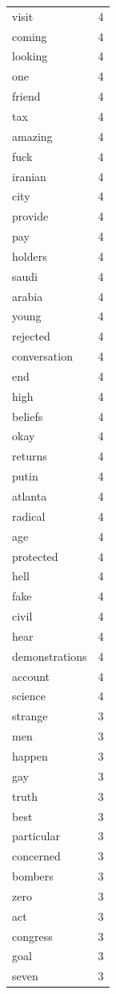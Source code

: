 \begin{tabular}{lr}
visit & 4 \\
coming & 4 \\
looking & 4 \\
one & 4 \\
friend & 4 \\
tax & 4 \\
amazing & 4 \\
fuck & 4 \\
iranian & 4 \\
city & 4 \\
provide & 4 \\
pay & 4 \\
holders & 4 \\
saudi & 4 \\
arabia & 4 \\
young & 4 \\
rejected & 4 \\
conversation & 4 \\
end & 4 \\
high & 4 \\
beliefs & 4 \\
okay & 4 \\
returns & 4 \\
putin & 4 \\
atlanta & 4 \\
radical & 4 \\
age & 4 \\
protected & 4 \\
hell & 4 \\
fake & 4 \\
civil & 4 \\
hear & 4 \\
demonstrations & 4 \\
account & 4 \\
science & 4 \\
strange & 3 \\
men & 3 \\
happen & 3 \\
gay & 3 \\
truth & 3 \\
best & 3 \\
particular & 3 \\
concerned & 3 \\
bombers & 3 \\
zero & 3 \\
act & 3 \\
congress & 3 \\
goal & 3 \\
seven & 3 \\

\end{tabular}
